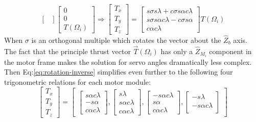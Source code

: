 {\begin{subequations}
\begin{equation}
\begin{bmatrix}
\end{bmatrix}
\begin{bmatrix}
0\\
0\\
T(\Omega_i)
\end{bmatrix}
\end{equation}
\begin{equation}\label{eq:rotation-inverse}
\Rightarrow
\begin{bmatrix}
T_x\\
T_y\\
T_z
\end{bmatrix}
=\begin{bmatrix}
s\sigma s\lambda + c\sigma s\alpha c\lambda\\
s\sigma s\alpha c\lambda - c\sigma s\alpha\\
c\alpha c\lambda
\end{bmatrix}
T(\Omega_i)
\end{equation}
\end{subequations}
When $\sigma$ is an orthogonal multiple which rotates the vector about the $\hat{Z}_b$ axis. The fact that the principle thrust vector $\vec{T}(\Omega_i)$ has only a $\hat{Z}_{M_i}$ component in the motor frame makes the solution for servo angles dramatically less complex. Then Eq:\ref{eq:rotation-inverse} simplifies even further to the following four trigonometric relations for each motor module:
\begin{equation}
\begin{bmatrix}
T_x\\
T_y\\
T_z
\end{bmatrix}
=
\begin{bmatrix}
\begin{bmatrix}
s\alpha c\lambda\\
-s\alpha \\
c\alpha c\lambda
\end{bmatrix}
,
\begin{bmatrix}
s\lambda\\
s\alpha c\lambda\\
c\alpha c\lambda
\end{bmatrix}
,
\begin{bmatrix}
-s\alpha c\lambda\\
s\alpha\\
c\alpha c\lambda
\end{bmatrix}
,
\begin{bmatrix}
-s\lambda\\
-s\alpha c\lambda\\

\end{bmatrix}
\end{bmatrix}
\end{equation}}

